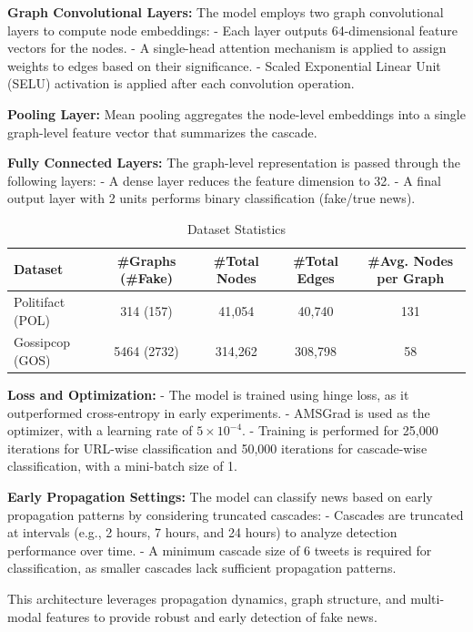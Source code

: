 \documentclass[sigconf,nonacm]{acmart}
\begin{document}
\textbf{Graph Convolutional Layers:}  
The model employs two graph convolutional layers to compute node embeddings:
- Each layer outputs 64-dimensional feature vectors for the nodes.
- A single-head attention mechanism is applied to assign weights to edges based on their significance.
- Scaled Exponential Linear Unit (SELU) activation is applied after each convolution operation.

\textbf{Pooling Layer:}  
Mean pooling aggregates the node-level embeddings into a single graph-level feature vector that summarizes the cascade.

\textbf{Fully Connected Layers:}  
The graph-level representation is passed through the following layers:
- A dense layer reduces the feature dimension to 32.
- A final output layer with 2 units performs binary classification (fake/true news).
\begin{table}[t]
    \centering
    \caption{Dataset Statistics}
    \begin{tabular}{lcccc}
        \toprule
        \textbf{Dataset} & \textbf{\#Graphs (\#Fake)} & \textbf{\#Total Nodes} & \textbf{\#Total Edges} & \textbf{\#Avg. Nodes per Graph} \\
        \midrule
        Politifact (POL) & 314 (157) & 41,054 & 40,740 & 131 \\
        Gossipcop (GOS)  & 5464 (2732) & 314,262 & 308,798 & 58 \\
        \bottomrule
    \end{tabular}
    \label{tab:data_statistics}
\end{table}
\textbf{Loss and Optimization:}  
- The model is trained using hinge loss, as it outperformed cross-entropy in early experiments.
- AMSGrad is used as the optimizer, with a learning rate of \( 5 \times 10^{-4} \).
- Training is performed for 25,000 iterations for URL-wise classification and 50,000 iterations for cascade-wise classification, with a mini-batch size of 1.

\textbf{Early Propagation Settings:}  
The model can classify news based on early propagation patterns by considering truncated cascades:
- Cascades are truncated at intervals (e.g., 2 hours, 7 hours, and 24 hours) to analyze detection performance over time.
- A minimum cascade size of 6 tweets is required for classification, as smaller cascades lack sufficient propagation patterns.

This architecture leverages propagation dynamics, graph structure, and multi-modal features to provide robust and early detection of fake news.
\end{document}
